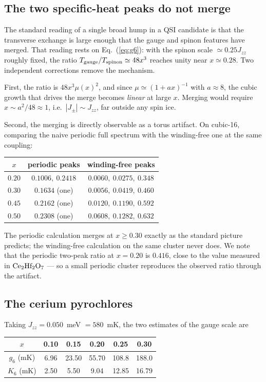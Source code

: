 \documentclass[aps,prb,preprint,amsmath,amssymb,superscriptaddress,
longbibliography,floatfix]{revtex4-2}
\newcommand{\Jzz}{J_{zz}}
\newcommand{\Jpm}{J_{\pm}}
\begin{document}
\subsection{The two specific-heat peaks do not merge}

The standard reading of a single broad hump in a QSI candidate is that the
transverse exchange is large enough that the gauge and spinon features have
merged.  That reading rests on Eq.~(\ref{eq:g6}): with the spinon scale
$\simeq0.25\Jzz$ roughly fixed, the ratio $T_{\rm gauge}/T_{\rm spinon}\simeq
48x^3$ reaches unity near $x\simeq0.28$.  Two independent corrections remove
the mechanism.

First, the ratio is $48x^3\mu(x)^2$, and since $\mu\simeq(1+ax)^{-1}$ with
$a\approx8$, the cubic growth that drives the merge becomes \emph{linear} at
large $x$.  Merging would require $x\sim a^2/48\approx1$, i.e.\
$|\Jpm|\sim\Jzz$, far outside any spin ice.

Second, the merging is directly observable as a torus artifact.  On cubic-16,
comparing the naive periodic full spectrum with the winding-free one at the
same coupling:
\begin{center}
\begin{tabular}{ccc}
$x$ & periodic peaks & winding-free peaks\\ \hline
$0.20$ & $0.1006,\ 0.2418$ & $0.0060,\ 0.0275,\ 0.348$\\
$0.30$ & $0.1634$ (one) & $0.0056,\ 0.0419,\ 0.460$\\
$0.45$ & $0.2162$ (one) & $0.0120,\ 0.1190,\ 0.592$\\
$0.50$ & $0.2308$ (one) & $0.0608,\ 0.1282,\ 0.632$\\
\end{tabular}
\end{center}
The periodic calculation merges at $x\ge0.30$ exactly as the standard picture
predicts; the winding-free calculation on the same cluster never does.  We note
that the periodic two-peak ratio at $x=0.20$ is $0.416$, close to the value
measured in $\rm Ce_2Hf_2O_7$ --- so a small periodic cluster reproduces the
observed ratio through the artifact.

\subsection{The cerium pyrochlores}

Taking $\Jzz=0.050$~meV $=580$~mK, the two estimates of the gauge scale are

\begin{center}
\begin{tabular}{cccccc}
$x$ & 0.10 & 0.15 & 0.20 & 0.25 & 0.30\\ \hline
$g_6$ (mK) & 6.96 & 23.50 & 55.70 & 108.8 & 188.0\\
$K_6$ (mK) & 2.50 & 5.50 & 9.04 & 12.85 & 16.79\\
\end{tabular}
\end{center}
\end{document}
